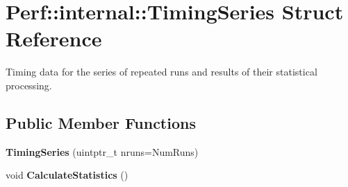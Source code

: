 \hypertarget{structPerf_1_1internal_1_1TimingSeries}{}\section{Perf\+:\+:internal\+:\+:Timing\+Series Struct Reference}
\label{structPerf_1_1internal_1_1TimingSeries}


Timing data for the series of repeated runs and results of their statistical processing.  


\subsection*{Public Member Functions}
\begin{DoxyCompactItemize}
\item 
\hypertarget{structPerf_1_1internal_1_1TimingSeries_a9c99f19da7644b38ca85841ef26b0478}{}{\bfseries Timing\+Series} (uintptr\+\_\+t nruns=Num\+Runs)\label{structPerf_1_1internal_1_1TimingSeries_a9c99f19da7644b38ca85841ef26b0478}

\item 
\hypertarget{structPerf_1_1internal_1_1TimingSeries_aeb8ba9bd12c6b8c3c5426cffdf6caec3}{}void {\bfseries Calculate\+Statistics} ()\label{structPerf_1_1internal_1_1TimingSeries_aeb8ba9bd12c6b8c3c5426cffdf6caec3}

\end{DoxyCompactItemize}

